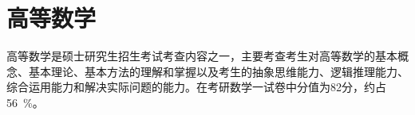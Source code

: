 \chapter{高等数学}
	高等数学是硕士研究生招生考试考查内容之一，主要考查考生对高等数学的基本概念、基本理论、基本方法的理解和掌握以及考生的抽象思维能力、逻辑推理能力、综合运用能力和解决实际问题的能力。在考研数学一试卷中分值为82分，约占 \SI{56}{\percent}。
	
	
	
	
	
	
	
	
	
	
	
	
	
	
	
	
	
	
	
	
	
	
	
	
	
	
	
	
	
	
	
	
	
	
	
	
	
	
	
	
	
	
	